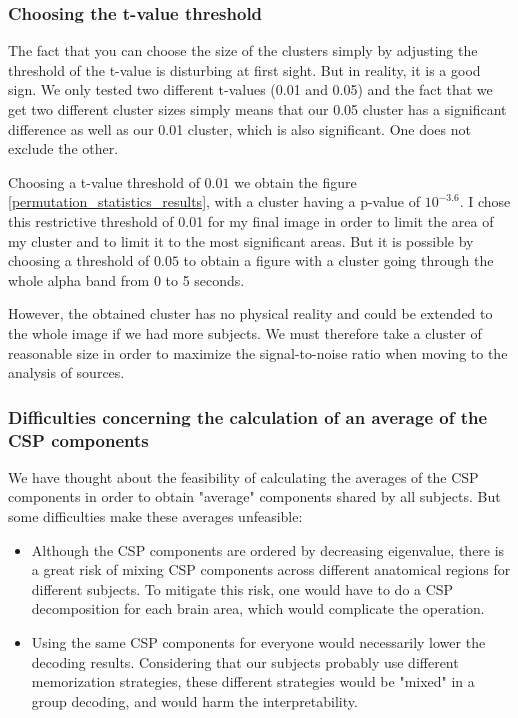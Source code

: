 
\subsubsection{Choosing the t-value threshold}

The fact that you can choose the size of the clusters simply by adjusting the threshold of the t-value is disturbing at first sight. But in reality, it is a good sign. We only tested two different t-values (0.01 and 0.05) and the fact that we get two different cluster sizes simply means that our 0.05 cluster has a significant difference as well as our 0.01 cluster, which is also significant. One does not exclude the other.

Choosing a t-value threshold of $0.01$ we obtain the figure \ref{permutation_statistics_results}, with a cluster having a p-value of $10^{-3.6}$. I chose this restrictive threshold of 0.01 for my final image in order to limit the area of my cluster and to limit it to the most significant areas. But it is possible by choosing a threshold of $0.05$ to obtain a figure with a cluster going through the whole alpha band from 0 to 5 seconds.

However, the obtained cluster has no physical reality and could be extended to the whole image if we had more subjects. We must therefore take a cluster of reasonable size in order to maximize the signal-to-noise ratio when moving to the analysis of sources.


\subsubsection{Difficulties concerning the calculation of an average of the CSP components}
\label{section:csp_average_difficulty}

We have thought about the feasibility of calculating the averages of the CSP components in order to obtain "average" components shared by all subjects. But some difficulties make these averages unfeasible:
\begin{itemize}
    \item Although the CSP components are ordered by decreasing eigenvalue, there is a great risk of mixing CSP components across different anatomical regions for different subjects. To mitigate this risk, one would have to do a CSP decomposition for each brain area, which would complicate the operation.
    \item Using the same CSP components for everyone would necessarily lower the decoding results. Considering that our subjects probably use different memorization strategies, these different strategies would be "mixed" in a group decoding, and would harm the interpretability.
\end{itemize}


